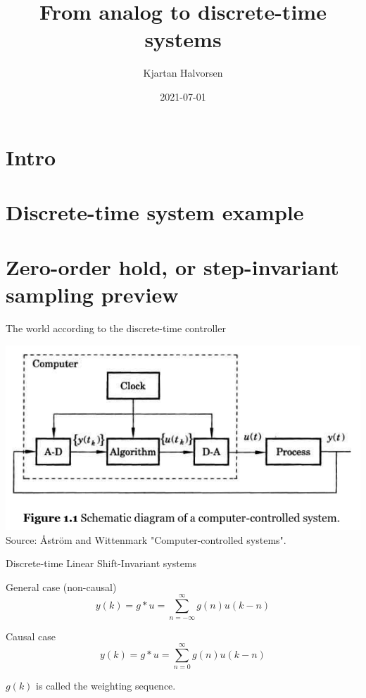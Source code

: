 \documentclass[presentation,aspectratio=169]{beamer}
\author{Kjartan Halvorsen}
\date{2021-07-01}
\title{From analog to discrete-time systems}
\begin{document}
\maketitle

\section{Intro}
\label{sec:org580daf5}


\section{Discrete-time system example}
\label{sec:org4253ff0}

\section{Zero-order hold, or step-invariant sampling preview}
\label{sec:org5d042aa}

\begin{frame}[label={sec:org9b252d5}]{The world according to the discrete-time controller}
\begin{center}
\includegraphics[width=0.6\linewidth]{../../figures/fig1-1-schematic.png} Source: Åström and Wittenmark "Computer-controlled systems".
\end{center}
\end{frame}

\begin{frame}[label={sec:org5fb7d0a}]{Discrete-time Linear Shift-Invariant systems}
\begin{center}
\end{center}
\begin{block}{General case (non-causal)}
\[ y(k) = g \ast u = \sum_{n=-\infty}^\infty g(n) u(k-n) \]
\end{block}

\begin{block}{Causal case}
\[ y(k) = g \ast u = \sum_{n=0}^\infty g(n) u(k-n) \]


\(g(k)\) is called the \alert{weighting sequence}.
\end{block}
\end{frame}
\end{document}
